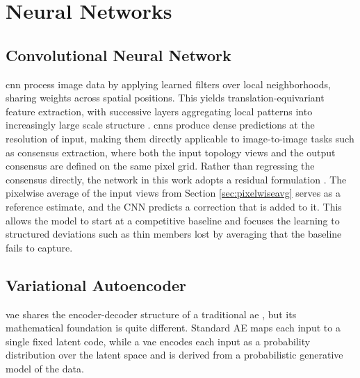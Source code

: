 \documentclass[
  numbers=noenddot,
  english,  %
  a4paper,  %
  twoside,  %
  bibliography=totoc,
  headsepline,
  cleardoublepage=empty,
  parskip=half,
  draft=false
]{scrbook}
\theoremstyle{break}
\begin{document}
\section{Neural Networks}\label{sec:background:nn}


\subsection{Convolutional Neural Network}\label{sec:background:cnn}
\gls{cnn} process image data by applying learned filters over local neighborhoods, sharing weights across spatial positions. This yields translation-equivariant feature extraction, with successive layers aggregating local patterns into increasingly large scale structure  \cite{c6}. \gls{cnn}s produce dense predictions at the resolution of input, making them directly applicable to image-to-image tasks such as consensus extraction, where both the input topology views and the output consensus are defined on the same pixel grid.
Rather than regressing the consensus directly, the network in this work adopts a residual formulation \cite{c7}. The pixelwise average of the input views from Section \ref{sec:pixelwiseavg} serves as a reference estimate, and the CNN predicts a correction that is added to it. This allows the model to start at a competitive baseline and focuses the learning to structured deviations such as thin members lost by averaging that the baseline fails to capture.

\subsection{Variational Autoencoder}\label{sec:background:vae}
\gls{vae} \cite{c8} shares the encoder-decoder structure of a traditional \gls{ae} \cite{c9}, but its mathematical foundation is quite different. Standard AE maps each input to a single fixed latent code, while a \gls{vae} encodes each input as a probability distribution over the latent space and is derived from a probabilistic generative model of the data.
\end{document}
